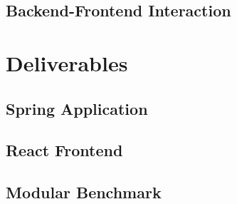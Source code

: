 \section{Backend-Frontend Interaction}

\chapter{Deliverables}

\section{Spring Application}

\section{React Frontend}

\section{Modular Benchmark}
